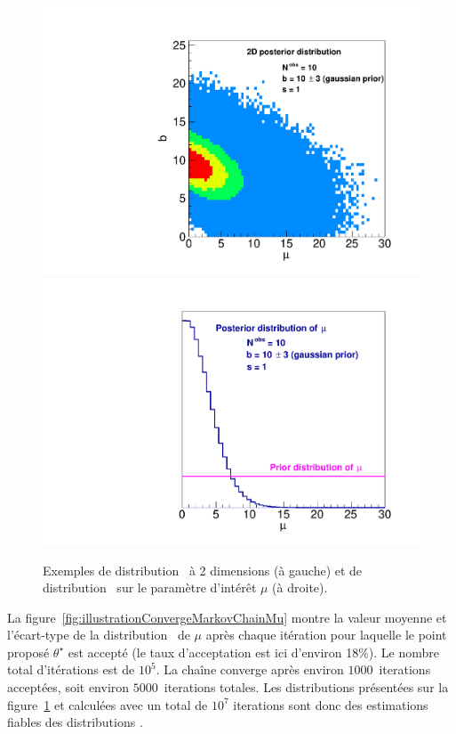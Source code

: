 \begin{figure}[!htb]
\begin{center}
\hspace*{-0.6cm}
\includegraphics[scale=0.35]{figures/Posterior2DPoissonWithUncertainBkg.pdf}
\includegraphics[scale=0.35]{figures/PosteriorSignalPoissonWithUncertainBkg.pdf}
\caption{Exemples de distribution \posterior~\`a 2 dimensions (\`a gauche) et de distribution \posterior~sur le param\`etre d'int\'er\^et $\mu$ (\`a droite).\label{fig:Posterior2DPoissonWithUncertainBkg}}
\end{center}
\end{figure}

La figure~\ref{fig:illustrationConvergeMarkovChainMu} 
montre la valeur moyenne et l'\'ecart-type de la distribution \posterior~de $\mu$ 
apr\`es chaque itération pour laquelle le point propos\'e $\theta^\star$ est accept\'e (le taux d'acceptation est ici d'environ 18\%). Le nombre total d'it\'erations est de $10^5$. La cha\^ine converge apr\`es environ $1000$~iterations accept\'ees, soit environ $5000$~iterations totales. Les distributions pr\'esent\'ees sur la figure~\ref{fig:Posterior2DPoissonWithUncertainBkg} et calcul\'ees avec un total de $10^7$ iterations sont donc des estimations fiables des distributions \posterior.
 
